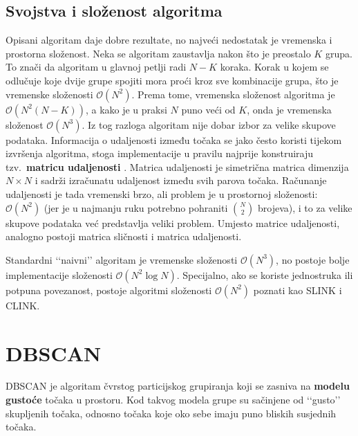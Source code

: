\documentclass[times, utf8, zavrsni]{fer}
\begin{document}
\subsection{Svojstva i složenost algoritma}
Opisani algoritam daje dobre rezultate, no najveći nedostatak je vremenska i prostorna složenost. Neka se algoritam zaustavlja nakon što je preostalo $K$ grupa. To znači da algoritam u glavnoj petlji radi $N-K$ koraka. Korak u kojem se odlučuje koje dvije grupe spojiti mora proći kroz sve kombinacije grupa, što je vremenske složenosti $\mathcal{O} \left(N^2\right)$. Prema tome, vremenska složenost algoritma je $\mathcal{O} \left(N^2 \left(N-K\right)\right)$, a kako je u praksi $N$ puno veći od $K$, onda je vremenska složenost $\mathcal{O} \left(N^3\right)$. Iz tog razloga algoritam nije dobar izbor za velike skupove podataka. Informacija o udaljenosti između točaka se jako često koristi tijekom izvršenja algoritma, stoga implementacije u pravilu najprije konstruiraju tzv.\ \textbf{matricu udaljenosti} . Matrica udaljenosti je simetrična matrica dimenzija $N \times N$ i sadrži izračunatu udaljenost između svih parova točaka. Računanje udaljenosti je tada vremenski brzo, ali problem je u prostornoj složenosti: $\mathcal{O} \left(N^2\right)$ (jer je u najmanju ruku potrebno pohraniti $\binom{N}{2}$ brojeva), i to za velike skupove podataka već predstavlja veliki problem. Umjesto matrice udaljenosti, analogno postoji matrica sličnosti i matrica udaljenosti.

Standardni ‘‘naivni’’ algoritam je vremenske složenosti $\mathcal{O} \left(N^3\right)$, no postoje bolje implementacije složenosti $\mathcal{O} \left(N^2 \log N\right)$. Specijalno, ako se koriste jednostruka ili potpuna povezanost, postoje algoritmi složenosti $\mathcal{O} \left(N^2\right)$ poznati kao SLINK i CLINK.

\section{DBSCAN}
DBSCAN  je algoritam čvrstog particijskog grupiranja koji se zasniva na \textbf{modelu gustoće}  točaka u prostoru. Kod takvog modela grupe su sačinjene od ‘‘gusto’’ skupljenih točaka, odnosno točaka koje oko sebe imaju puno bliskih susjednih točaka.
\end{document}
